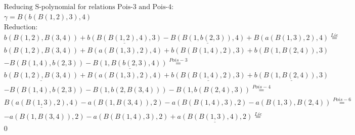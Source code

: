 \documentclass[11pt]{amsart}
\begin{document}
\begin{align*} 
& \text{Reducing S-polynomial for relations Pois-3 and Pois-4:} \\ 
& \gamma = B(b(B(1,2),3),4) \\ 
& \text{Reduction}: \\&b(B(1,2),B(3,4)) + \underline{b(B(B(1,2),4),3)} - \underline{B(B(1,b(2,3)),4)} + B(a(B(1,3),2),4) \stackrel{ Lie }{=}  \\ 
&b(B(1,2),B(3,4)) + B(a(B(1,3),2),4) + b(B(B(1,4),2),3) + b(B(1,B(2,4)),3)\\ 
 &  - B(B(1,4),b(2,3)) - \underline{B(1,B(b(2,3),4))} \stackrel{ Pois-3 }{=}  \\ 
&\underline{b(B(1,2),B(3,4))} + B(a(B(1,3),2),4) + \underline{b(B(B(1,4),2),3)} + \underline{b(B(1,B(2,4)),3)}\\ 
 &  - B(B(1,4),b(2,3)) - B(1,b(2,B(3,4))) - B(1,b(B(2,4),3)) \stackrel{ Pois-4 }{=}  \\ 
&\underline{B(a(B(1,3),2),4)} - a(B(1,B(3,4)),2) - a(B(B(1,4),3),2) - a(B(1,3),B(2,4)) \stackrel{ Pois-6 }{=}  \\ 
& - a(B(1,B(3,4)),2) - a(B(B(1,4),3),2) + \underline{a(B(B(1,3),4),2)} \stackrel{ Lie }{=}  \\ 
&0\\ 
\end{align*} 
 
\end{document}
